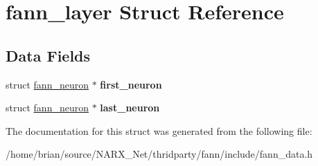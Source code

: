 \hypertarget{structfann__layer}{\section{fann\-\_\-layer Struct Reference}
\label{structfann__layer}
}
\subsection*{Data Fields}
\begin{DoxyCompactItemize}
\item 
\hypertarget{structfann__layer_a356c3ab9a8f2e45d031e077f1ed40008}{struct \hyperlink{structfann__neuron}{fann\-\_\-neuron} $\ast$ {\bfseries first\-\_\-neuron}}\label{structfann__layer_a356c3ab9a8f2e45d031e077f1ed40008}

\item 
\hypertarget{structfann__layer_a70052618da543b358705c4408acc6ef4}{struct \hyperlink{structfann__neuron}{fann\-\_\-neuron} $\ast$ {\bfseries last\-\_\-neuron}}\label{structfann__layer_a70052618da543b358705c4408acc6ef4}

\end{DoxyCompactItemize}


The documentation for this struct was generated from the following file\-:\begin{DoxyCompactItemize}
\item 
/home/brian/source/\-N\-A\-R\-X\-\_\-\-Net/thridparty/fann/include/fann\-\_\-data.\-h\end{DoxyCompactItemize}
